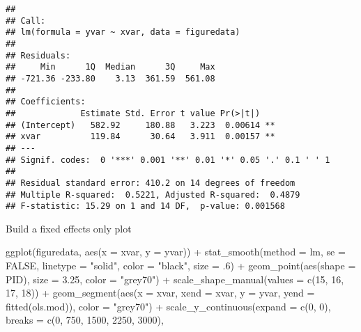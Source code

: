 \documentclass[
]{article}
\newenvironment{Shaded}{\begin{snugshade}}{\end{snugshade}}
\newcommand{\AttributeTok}[1]{\textcolor[rgb]{0.77,0.63,0.00}{#1}}
\newcommand{\ConstantTok}[1]{\textcolor[rgb]{0.00,0.00,0.00}{#1}}
\newcommand{\DecValTok}[1]{\textcolor[rgb]{0.00,0.00,0.81}{#1}}
\newcommand{\FloatTok}[1]{\textcolor[rgb]{0.00,0.00,0.81}{#1}}
\newcommand{\FunctionTok}[1]{\textcolor[rgb]{0.00,0.00,0.00}{#1}}
\newcommand{\NormalTok}[1]{#1}
\newcommand{\SpecialCharTok}[1]{\textcolor[rgb]{0.00,0.00,0.00}{#1}}
\newcommand{\StringTok}[1]{\textcolor[rgb]{0.31,0.60,0.02}{#1}}
\begin{document}
\begin{verbatim}
## 
## Call:
## lm(formula = yvar ~ xvar, data = figuredata)
## 
## Residuals:
##     Min      1Q  Median      3Q     Max 
## -721.36 -233.80    3.13  361.59  561.08 
## 
## Coefficients:
##             Estimate Std. Error t value Pr(>|t|)   
## (Intercept)   582.92     180.88   3.223  0.00614 **
## xvar          119.84      30.64   3.911  0.00157 **
## ---
## Signif. codes:  0 '***' 0.001 '**' 0.01 '*' 0.05 '.' 0.1 ' ' 1
## 
## Residual standard error: 410.2 on 14 degrees of freedom
## Multiple R-squared:  0.5221, Adjusted R-squared:  0.4879 
## F-statistic: 15.29 on 1 and 14 DF,  p-value: 0.001568
\end{verbatim}

Build a fixed effects only plot

\begin{Shaded}
\begin{Highlighting}[]
\FunctionTok{ggplot}\NormalTok{(figuredata, }\FunctionTok{aes}\NormalTok{(}\AttributeTok{x =}\NormalTok{ xvar, }\AttributeTok{y =}\NormalTok{ yvar)) }\SpecialCharTok{+} 
  \FunctionTok{stat\_smooth}\NormalTok{(}\AttributeTok{method =}\NormalTok{ lm, }\AttributeTok{se =} \ConstantTok{FALSE}\NormalTok{, }\AttributeTok{linetype =} \StringTok{"solid"}\NormalTok{, }
              \AttributeTok{color =} \StringTok{"black"}\NormalTok{, }\AttributeTok{size =}\NormalTok{ .}\DecValTok{6}\NormalTok{) }\SpecialCharTok{+}
  \FunctionTok{geom\_point}\NormalTok{(}\FunctionTok{aes}\NormalTok{(}\AttributeTok{shape =}\NormalTok{ PID), }\AttributeTok{size =} \FloatTok{3.25}\NormalTok{, }\AttributeTok{color =} \StringTok{"grey70"}\NormalTok{) }\SpecialCharTok{+}
  \FunctionTok{scale\_shape\_manual}\NormalTok{(}\AttributeTok{values =} \FunctionTok{c}\NormalTok{(}\DecValTok{15}\NormalTok{, }\DecValTok{16}\NormalTok{, }\DecValTok{17}\NormalTok{, }\DecValTok{18}\NormalTok{)) }\SpecialCharTok{+} 
  \FunctionTok{geom\_segment}\NormalTok{(}\FunctionTok{aes}\NormalTok{(}\AttributeTok{x =}\NormalTok{ xvar, }\AttributeTok{xend =}\NormalTok{ xvar, }
                   \AttributeTok{y =}\NormalTok{ yvar, }\AttributeTok{yend =} \FunctionTok{fitted}\NormalTok{(ols.mod)), }
               \AttributeTok{color =} \StringTok{"grey70"}\NormalTok{) }\SpecialCharTok{+}
  \FunctionTok{scale\_y\_continuous}\NormalTok{(}\AttributeTok{expand =} \FunctionTok{c}\NormalTok{(}\DecValTok{0}\NormalTok{, }\DecValTok{0}\NormalTok{), }\AttributeTok{breaks =} \FunctionTok{c}\NormalTok{(}\DecValTok{0}\NormalTok{, }\DecValTok{750}\NormalTok{, }\DecValTok{1500}\NormalTok{, }\DecValTok{2250}\NormalTok{, }\DecValTok{3000}\NormalTok{), }

\end{Highlighting}
\end{Shaded}
\end{document}
